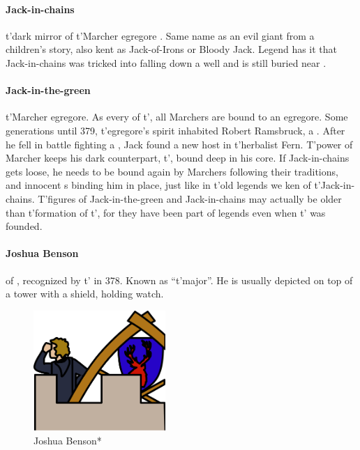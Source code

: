 \paragraph{Jack-in-chains} t'\allowbreak dark mirror of t'\allowbreak Marcher egregore . Same name as an evil giant from a children's story, also kent as Jack-of-Irons or Bloody Jack. Legend has it that Jack-in-chains was tricked into falling down a well and is still buried near .
\paragraph{Jack-in-the-green} t'\allowbreak Marcher egregore. As every  of t'\allowbreak {}, all Marchers are bound to an egregore. Some generations until 379, t'\allowbreak egregore's spirit inhabited Robert Ramsbruck, a . After he fell in battle fighting a , Jack found a new host in t'\allowbreak herbalist Fern. T'power of Marcher  keeps his dark counterpart, t'\allowbreak {}, bound deep in his core. If Jack-in-chains gets loose, he needs to be bound again by Marchers following their traditions, and innocent s binding him in place, just like in t'\allowbreak old legends we ken of t'\allowbreak Jack-in-chains. T'figures of Jack-in-the-green and Jack-in-chains may actually be older than t'\allowbreak formation of t'\allowbreak {}, for they have been part of legends even when t'\allowbreak {} was founded.
\paragraph{Joshua Benson}  of , recognized by t'\allowbreak {} in 378. Known as “t'major”. He is usually depicted on top of a tower with a shield, holding watch.\begin{figure} \centering \includegraphics[width=5cm]{encyclopedia/Major} \caption{Joshua Benson*}\end{figure}
